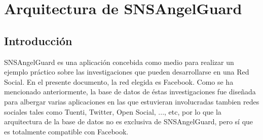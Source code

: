 
\chapter{Arquitectura de SNSAngelGuard} 
\section{Introducción}
SNSAngelGuard es una aplicación concebida como medio para realizar un ejemplo práctico sobre las investigaciones que pueden desarrollarse en una Red Social. En el presente documento, la red elegida es Facebook. Como se ha mencionado anteriormente, la base de datos de éstas investigaciones fue diseñada para albergar varias aplicaciones en las que estuvieran involucradas tambien redes sociales tales como Tuenti, Twitter, Open Social, ..., etc, por lo que la arquitectura de la base de datos no es exclusiva de SNSAngelGuard, pero sí que es totalmente compatible con Facebook.

